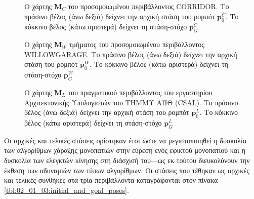 \begin{figure}\centering
  
  \vspace{0.3cm}
  \caption{\small Ο χάρτης $\bm{M}_C$ του προσομοιωμένου περιβάλλοντος CORRIDOR.
           Το πράσινο βέλος (άνω δεξιά) δείχνει την αρχική στάση του ρομπότ
           $\bm{p}_0^C$. Tο κόκκινο βέλος (κάτω αριστερά) δείχνει τη στάση-στόχο
           $\bm{p}_G^C$}
  \label{fig:02_01_03:map_corridor}
\end{figure}

\begin{figure}\centering
  
  \vspace{0.1cm}
  \caption{\small Ο χάρτης $\bm{M}_W$ τμήματος του προσομοιωμένου περιβάλλοντος
           WILLOWGARAGE. Το πράσινο βέλος (άνω δεξιά) δείχνει την αρχική στάση
           του ρομπότ $\bm{p}_0^W$. Tο κόκκινο βέλος (κάτω αριστερά) δείχνει τη
           στάση-στόχο $\bm{p}_G^W$}
  \label{fig:02_01_03:map_willowgarage}
\end{figure}

\begin{figure}\centering
  
  \vspace{-0.2cm}
  \caption{\small Ο χάρτης $\bm{M}_L$ του πραγματικού περιβάλλοντος του
           εργαστηρίου Αρχιτεκτονικής Υπολογιστών του ΤΗΜΜΥ ΑΠΘ (CSAL). Το
           πράσινο βέλος (άνω δεξιά) δείχνει την αρχική στάση του ρομπότ
           $\bm{p}_0^L$. Tο κόκκινο βέλος (κάτω αριστερά) δείχνει τη στάση-στόχο
           $\bm{p}_G^L$}
  \label{fig:02_01_03:map_csal}
\end{figure}

Οι αρχικές και τελικές στάσεις ορίστηκαν έτσι ώστε να μεγιστοποιηθεί η δυσκολία
των αλγορίθμων χάραξης μονοπατιών στην εύρεση ενός εφικτού μονοπατιού και η
δυσκολία των ελεγκτών κίνησης στη διάσχισή του---ως εκ τούτου διευκολύνουν την
έκθεση των αδυναμιών των τύπων αλγορίθμων. Οι στάσεις που τέθηκαν ως αρχικές
και τελικές συνθήκες στα τρία περιβάλλοντα καταγράφονται στον πίνακα
\ref{tbl:02_01_03:initial_and_goal_poses}.

